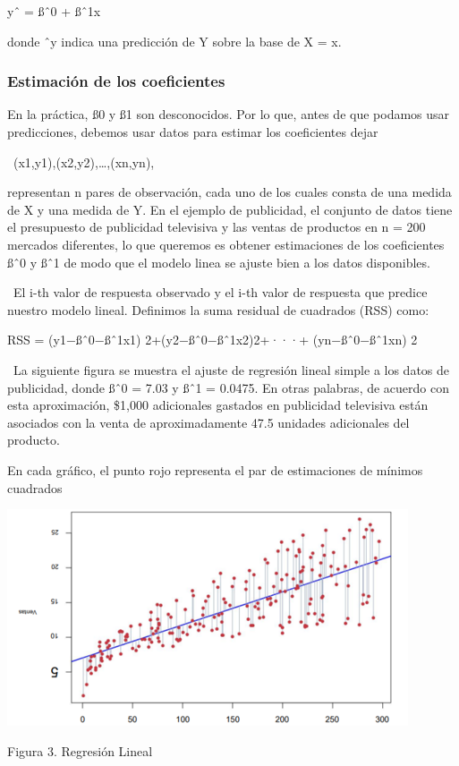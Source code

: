 \documentclass[
  letterpaper,
  DIV=11,
  numbers=noendperiod]{scrartcl}
\begin{document}
yˆ = ßˆ0 + ßˆ1x

donde ˆy indica una predicción de Y sobre la base de X = x.

\hypertarget{estimaciuxf3n-de-los-coeficientes}{%
\subsubsection{\texorpdfstring{\textbf{Estimación de los
coeficientes}}{Estimación de los coeficientes}}\label{estimaciuxf3n-de-los-coeficientes}}

En la práctica, ß0 y ß1 son desconocidos. Por lo que, antes de que
podamos usar predicciones, debemos usar datos para estimar los
coeficientes dejar

~(x1,y1),(x2,y2),\ldots,(xn,yn),

representan n pares de observación, cada uno de los cuales consta de una
medida de X y una medida de Y. En el ejemplo de publicidad, el conjunto
de datos tiene el presupuesto de publicidad televisiva y las ventas de
productos en n = 200 mercados diferentes, lo que queremos es obtener
estimaciones de los coeficientes ßˆ0 y ßˆ1 de modo que el modelo linea
se ajuste bien a los datos disponibles.

~El i-th valor de respuesta observado y el i-th valor de respuesta que
predice nuestro modelo lineal. Definimos la suma residual de cuadrados
(RSS) como:

RSS = (y1−ßˆ0−ßˆ1x1) 2+(y2−ßˆ0−ßˆ1x2)2+···+ (yn−ßˆ0−ßˆ1xn) 2

~La siguiente figura se muestra el ajuste de regresión lineal simple a
los datos de publicidad, donde ßˆ0 = 7.03 y ßˆ1 = 0.0475. En otras
palabras, de acuerdo con esta aproximación, \$1,000 adicionales gastados
en publicidad televisiva están asociados con la venta de aproximadamente
47.5 unidades adicionales del producto.

En cada gráfico, el punto rojo representa el par de estimaciones de
mínimos cuadrados

\begin{Figura 3. Regresión Lineal}

{\centering \includegraphics{cap12.png}

}

\caption{Figura 3. Regresión Lineal}

\end{Figura 3. Regresión Lineal}
\end{document}
